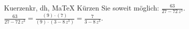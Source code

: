 \begin{MAufgabe}{Kuerzen}{kr, dh, MaTeX}
K\"urzen Sie soweit m\"oglich: $\frac{63}{27 - 72\, z^3}$.\\ 
\ifLsg\MLoesung
\quad $\frac{63}{27 - 72\, z^3}=\frac{(9)\cdot(7)}{(9)\cdot(3 - 8\, z^3)}=\frac{7}{3 - 8\, z^3}$.\else\relax\fi
 \end{MAufgabe}